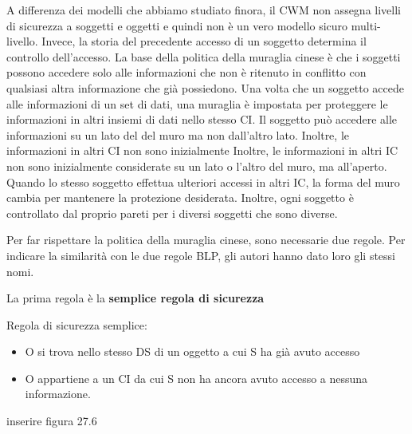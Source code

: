 A differenza dei modelli che abbiamo studiato finora, il CWM non assegna livelli di sicurezza a soggetti e oggetti e quindi non è un vero modello sicuro multi-livello. Invece, la storia del precedente accesso di un soggetto determina il controllo dell'accesso. La base della politica della muraglia cinese è che i soggetti possono accedere solo alle informazioni che non è ritenuto in conflitto con qualsiasi altra informazione che già possiedono. Una volta che un soggetto accede alle informazioni di un set di dati, una muraglia è impostata per proteggere le informazioni in altri insiemi di dati nello stesso CI. Il soggetto può accedere alle informazioni su un lato del del muro ma non dall'altro lato. Inoltre, le informazioni in altri CI non sono inizialmente Inoltre, le informazioni in altri IC non sono inizialmente considerate su un lato o l'altro del muro, ma all'aperto. Quando lo stesso soggetto effettua ulteriori accessi in altri IC, la forma del muro cambia per mantenere la protezione desiderata. Inoltre, ogni soggetto è controllato dal proprio pareti per i diversi soggetti che sono diverse.

\singlespacing

Per far rispettare la politica della muraglia cinese, sono necessarie due regole. Per indicare la similarità con le due regole BLP, gli autori hanno dato loro gli stessi nomi.

\singlespacing

\begin{center}
    La prima regola è la \textbf{semplice regola di sicurezza}
\end{center}
Regola di sicurezza semplice:
\begin{itemize}
    \item O si trova nello stesso DS di un oggetto a cui S ha già avuto accesso
    \item O appartiene a un CI da cui S non ha ancora avuto accesso a nessuna informazione.
\end{itemize}
inserire figura 27.6

